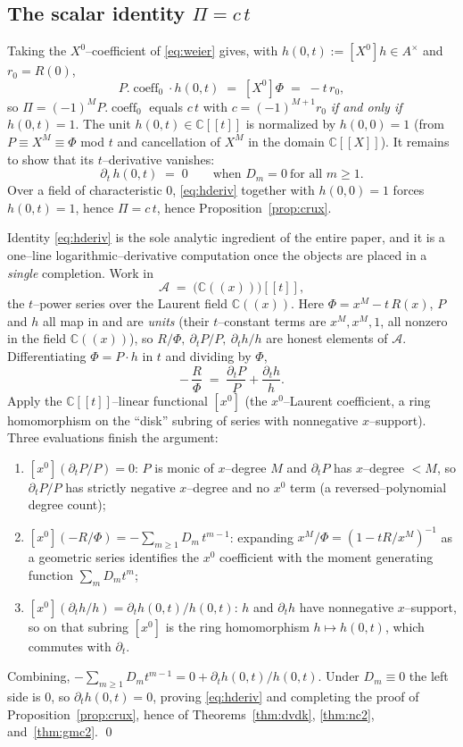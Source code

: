 \documentclass[11pt,reqno]{amsart}
\theoremstyle{plain}
\theoremstyle{definition}
\newcommand{\C}{\mathbb{C}}
\begin{document}
\subsection{The scalar identity $\Pi=c\,t$}
Taking the $X^0$--coefficient of \eqref{eq:weier} gives, with $h(0,t):=[X^0]h\in A^{\times}$ and
$r_0=R(0)$,
\begin{equation}\label{eq:pih}
  P.\!\operatorname{coeff}_0\cdot h(0,t)\;=\;[X^0]\Phi\;=\;-t\,r_0,
\end{equation}
so $\Pi=(-1)^M P.\!\operatorname{coeff}_0$ equals $c\,t$ with $c=(-1)^{M+1}r_0$ \emph{if and only if}
$h(0,t)=1$. The unit $h(0,t)\in\C[\![t]\!]$ is normalized by $h(0,0)=1$ (from $P\equiv X^M\equiv\Phi$ mod
$t$ and cancellation of $X^M$ in the domain $\C[\![X]\!]$). It remains to show that its $t$--derivative
vanishes:
\begin{equation}\label{eq:hderiv}
  \partial_t\,h(0,t)\;=\;0\qquad\text{when } D_m=0\ \text{for all } m\ge1 .
\end{equation}
Over a field of characteristic $0$, \eqref{eq:hderiv} together with $h(0,0)=1$ forces $h(0,t)=1$, hence
$\Pi=c\,t$, hence Proposition~\ref{prop:crux}.

Identity \eqref{eq:hderiv} is the sole analytic ingredient of the entire paper, and it is a
one--line logarithmic--derivative computation once the objects are placed in a \emph{single}
completion. Work in
\[
  \mathcal A\;=\;\big(\C(\!(x)\!)\big)[\![t]\!],
\]
the $t$--power series over the Laurent field $\C(\!(x)\!)$. Here $\Phi=x^{M}-t\,R(x)$, $P$ and $h$ all
map in and are \emph{units} (their $t$--constant terms are $x^{M},x^{M},1$, all nonzero in the field
$\C(\!(x)\!)$), so $R/\Phi,\ \partial_tP/P,\ \partial_th/h$ are honest elements of $\mathcal A$.
Differentiating $\Phi=P\cdot h$ in $t$ and dividing by $\Phi$,
\[
  -\,\frac{R}{\Phi}\;=\;\frac{\partial_tP}{P}+\frac{\partial_th}{h}.
\]
Apply the $\C[\![t]\!]$--linear functional $[x^{0}]$ (the $x^0$--Laurent coefficient, a ring
homomorphism on the ``disk'' subring of series with nonnegative $x$--support). Three evaluations finish
the argument:
\begin{enumerate}[label=(\roman*)]
\item $[x^{0}](\partial_tP/P)=0$: $P$ is monic of $x$--degree $M$ and $\partial_tP$ has $x$--degree $<M$,
so $\partial_tP/P$ has strictly negative $x$--degree and no $x^0$ term (a reversed--polynomial degree
count);
\item $[x^{0}](-R/\Phi)=-\sum_{m\ge1}D_m\,t^{m-1}$: expanding $x^{M}/\Phi=(1-tR/x^{M})^{-1}$ as a
geometric series identifies the $x^0$ coefficient with the moment generating function
$\sum_m D_m t^{m}$;
\item $[x^{0}](\partial_th/h)=\partial_t h(0,t)/h(0,t)$: $h$ and $\partial_t h$ have nonnegative
$x$--support, so on that subring $[x^0]$ is the ring homomorphism $h\mapsto h(0,t)$, which commutes with
$\partial_t$.
\end{enumerate}
Combining, $-\sum_{m\ge1}D_m t^{m-1}=0+\partial_t h(0,t)/h(0,t)$. Under $D_m\equiv0$ the left side is $0$,
so $\partial_t h(0,t)=0$, proving \eqref{eq:hderiv} and completing the proof of
Proposition~\ref{prop:crux}, hence of Theorems~\ref{thm:dvdk}, \ref{thm:nc2}, and~\ref{thm:gmc2}. \qed
\end{document}

